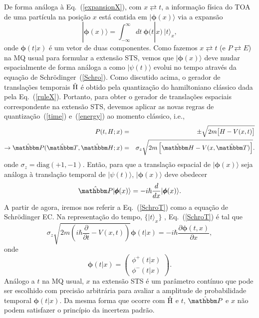De forma análoga à Eq.~(\ref{expansionX}), com  $x \rightleftarrows t$, a informação física do TOA de uma partícula na posição $x$ está contida em $|\pmb{\phi}(x)\rangle$ via a expansão
\begin{equation}\label{expansionT}
|{\pmb \phi(x)} \rangle =\int_{-\infty}^{\infty} dt~ \pmb \phi(t|x) ~|t\rangle_{x},
\end{equation}
onde $\pmb{\phi}(t|x)$ é um vetor de duas componentes. Como fazemos $x \rightleftarrows t$ (e $P \rightleftarrows E$) na MQ usual para formular a extensão STS, vemos que $|\pmb \phi(x) \rangle$ deve mudar espacialmente de forma análoga a como $|\psi(t)\rangle$ evolui no tempo através da equação de Schrödinger~(\ref{Schro}). Como discutido acima, o gerador de translações temporais  ${\hat {\textrm H}}$ é obtido pela quantização do hamiltoniano clássico dada pela Eq.~(\ref{ruleX}). Portanto, para obter o gerador de translações espaciais correspondente na extensão STS, devemos aplicar as novas regras de quantização~(\ref{time}) e~(\ref{energy}) ao momento clássico, i.e.,
\begin{eqnarray}\label{ruleP}
P(t,H;x)&=&\pm \sqrt{2m\big [H-V(x,t)\big ]} \nonumber\\
\rightarrow {\hat {\mathbbm P}}({\hat {\mathbbm T}},{\hat {\mathbbm H}};x)&=&\sigma_{z} \sqrt{2m\left[{\hat {\mathbbm H}}-V(x,{\hat {\mathbbm T}})\right]}.
\end{eqnarray}
onde $\sigma_z={\textrm {diag}}(+1,-1)$. Então, para que a translação espacial de $|\pmb \phi(x)\rangle$ seja análoga à translação temporal de $|\psi(t)\rangle$, $|\pmb \phi(x)\rangle$ deve obedecer
\begin{equation}\label{SchroT}
{\hat {\mathbbm P}}|{\pmb{\phi}(x)} \rangle=-i\hbar \frac{d}{dx}|{\pmb{\phi}(x) \rangle}.
\end{equation}
A partir de agora, iremos nos referir a Eq.~(\ref{SchroT}) como a equação de Schrödinger EC. Na representação do tempo, $\{|t\rangle_x\}$ , Eq.~(\ref{SchroT}) é tal que
\begin{equation}\label{Schro2T}
\sigma_{z} \sqrt{2m\left(i\hbar\frac{\partial}{\partial t}-V(x,t)\right)}\pmb{\phi}(t|x)=-i\hbar \frac{\partial \pmb{\phi}(t,x)}{\partial x},
\end{equation}
onde 
\begin{equation}\label{solT}
 \pmb{\phi} (t|x) = 
\begin{pmatrix}
    \phi^+ (t|x) \\
    \phi^- (t|x) 
\end{pmatrix}.
\end{equation}
Análogo a $t$ na MQ usual, $x$ na extensão STS é um parâmetro contínuo que pode ser escolhido com precisão arbitrária para avaliar a amplitude de probabilidade temporal $\pmb{\phi}(t|x)$. Da mesma forma que ocorre com ${\hat {\textrm H}}$ e $t$, ${\hat {\mathbbm P}}$ e $x$ não podem satisfazer o princípio da incerteza padrão.



